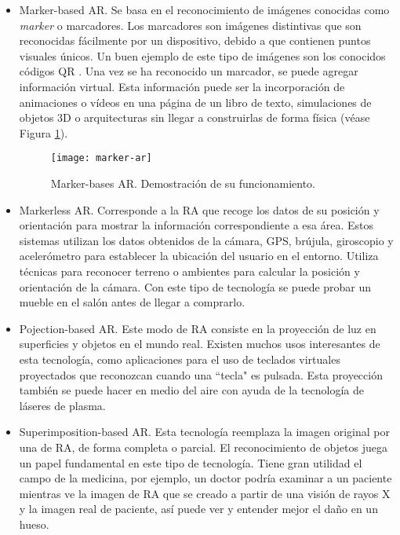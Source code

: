 \begin{itemize}
    \item 
    Marker-based AR. Se basa en el reconocimiento de imágenes conocidas como \textit{marker} o marcadores. 
		Los marcadores son imágenes distintivas que son reconocidas fácilmente por un dispositivo, debido a que contienen puntos visuales únicos. Un buen ejemplo de este tipo de imágenes son los conocidos códigos QR \cite{URL::CodigoQR}. Una vez se ha reconocido un marcador, se puede agregar información virtual. Esta información puede ser la incorporación de animaciones o vídeos en una página de un libro de texto, simulaciones de objetos 3D o arquitecturas sin llegar a construirlas de forma física (véase Figura \ref{fig:markerAR}).
    \begin{figure}[h]
        \centering
        \texttt{[image: marker-ar]}
        \caption{Marker-bases AR. Demostración de su funcionamiento.}
        \label{fig:markerAR}
    \end{figure}

   

    \item Markerless AR. Corresponde a la RA que recoge los datos de su posición y orientación para mostrar la información correspondiente a esa área. Estos sistemas utilizan los datos obtenidos de la cámara, GPS, brújula, giroscopio y acelerómetro para establecer la ubicación del usuario en el entorno. Utiliza técnicas para reconocer terreno o ambientes para calcular la posición y orientación de la cámara. Con este tipo de tecnología se puede probar un mueble en el salón antes de llegar a comprarlo.

 
    \item Pojection-based AR. Este modo de RA consiste en la proyección de luz en superficies y objetos en el mundo real. Existen muchos usos interesantes de esta tecnología, como aplicaciones para el uso de teclados virtuales proyectados que reconozcan cuando una ``tecla" es pulsada. Esta proyección también se puede hacer en medio del aire con ayuda de la tecnología de láseres de plasma.

    \item Superimposition-based AR. Esta tecnología reemplaza la imagen original por una de RA, de forma completa o parcial. El reconocimiento de objetos juega un papel fundamental en este tipo de tecnología. Tiene gran utilidad el campo de la medicina, por ejemplo, un doctor podría examinar a un paciente mientras ve la imagen de RA que se creado a partir de una visión de rayos X y la imagen real de paciente, así puede ver y entender mejor el daño en un hueso.
\end{itemize} 

